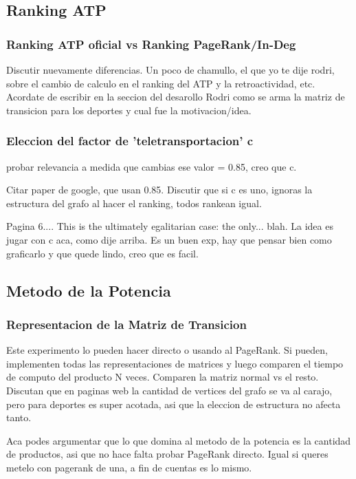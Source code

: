 \subsection{Ranking ATP}

\subsubsection{Ranking ATP oficial vs Ranking PageRank/In-Deg}
Discutir nuevamente diferencias. Un poco de chamullo, el que yo te dije rodri, sobre el cambio de calculo en el ranking del ATP y la retroactividad, etc. Acordate de escribir en la seccion del desarollo Rodri como se arma la matriz de transicion para los deportes y cual fue la motivacion/idea.

\subsubsection{Eleccion del factor de 'teletransportacion' c}
probar relevancia a medida que cambias ese valor = 0.85, creo que c.

Citar paper de google, que usan 0.85. Discutir que si c es uno, ignoras la estructura del grafo al hacer el ranking, todos rankean igual.

Pagina 6.... This is the ultimately egalitarian case: the only... blah. La idea es jugar con c aca, como dije arriba. Es un buen exp, hay que pensar bien como graficarlo y que quede lindo, creo que es facil.

\subsection{Metodo de la Potencia}

\subsubsection{Representacion de la Matriz de Transicion}
Este experimento lo pueden hacer directo o usando al PageRank. Si pueden, implementen todas las representaciones de matrices y luego comparen el tiempo de computo del producto N veces. Comparen la matriz normal vs el resto. Discutan que en paginas web la cantidad de vertices del grafo se va al carajo, pero para deportes es super acotada, asi que la eleccion de estructura no afecta tanto.

Aca podes argumentar que lo que domina al metodo de la potencia es la cantidad de productos, asi que no hace falta probar PageRank directo. Igual si queres metelo con pagerank de una, a fin de cuentas es lo mismo.

